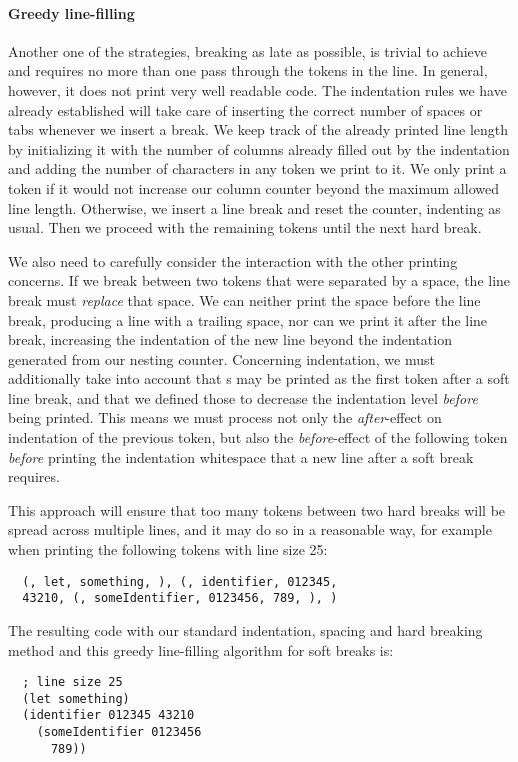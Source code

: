 \paragraph{Greedy line-filling}
Another one of the strategies, breaking as late as possible,
is trivial to achieve and requires no more than one pass through the tokens in the line.
In general, however, it does not print very well readable code.
The indentation rules we have already established will take care of inserting
the correct number of spaces or tabs whenever we insert a break.
We keep track of the already printed line length by initializing it with the
number of columns already filled out by the indentation and adding the number
of characters in any token we print to it.
We only print a token if it would not increase our column counter beyond
the maximum allowed line length.
Otherwise, we insert a line break and reset the counter, indenting as usual.
Then we proceed with the remaining tokens until the next hard break.

We also need to carefully consider the interaction with the other printing concerns.
If we break between two tokens that were separated by a space,
the line break must \textit{replace} that space.
We can neither print the space before the line break, producing a line with a trailing space,
nor can we print it after the line break, increasing the indentation of the new line
beyond the indentation generated from our nesting counter.
Concerning indentation, we must additionally take into account that s
may be printed as the first token after a soft line break,
and that we defined those to decrease the indentation level \textit{before} being printed.
This means we must process not only the \textit{after}-effect on indentation of the previous token,
but also the \textit{before}-effect of the following token \textit{before}
printing the indentation whitespace that a new line after a soft break requires.

This approach will ensure that too many tokens between two hard breaks will be spread
across multiple lines, and it may do so in a reasonable way,
for example when printing the following tokens with line size 25:
\begin{verbatim}
  (, let, something, ), (, identifier, 012345,
  43210, (, someIdentifier, 0123456, 789, ), )
\end{verbatim}
The resulting code with our standard indentation, spacing and hard breaking method
and this greedy line-filling algorithm for soft breaks is:
\begin{verbatim}
  ; line size 25
  (let something)
  (identifier 012345 43210
    (someIdentifier 0123456
      789))
\end{verbatim}
